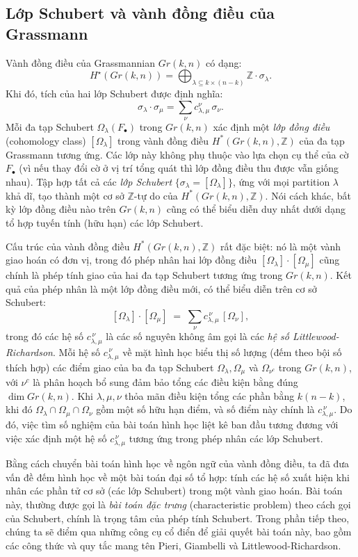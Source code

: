 \subsection{Lớp Schubert và vành đồng điều của Grassmann}
Vành đồng điều của Grassmannian $Gr(k,n)$ có dạng:
$$
H^\star(Gr(k,n)) = \bigoplus_{\lambda \subseteq k \times (n-k)} \mathbb{Z} \cdot \sigma_\lambda.
$$
Khi đó, tích của hai lớp Schubert được định nghĩa:
$$
\sigma_{\lambda} \cdot \sigma_{\mu} = \sum_{\nu} c_{\lambda, \mu}^{\nu} \, \sigma_{\nu}.
$$
Mỗi đa tạp Schubert $\Omega_\lambda(F_\bullet)$ trong $Gr(k,n)$ xác định một \textit{lớp đồng điều} (cohomology class) $[\Omega_\lambda]$ trong vành đồng điều $H^*(Gr(k,n), \mathbb{Z})$ của đa tạp Grassmann tương ứng. Các lớp này không phụ thuộc vào lựa chọn cụ thể của cờ $F_\bullet$ (vì nếu thay đổi cờ ở vị trí tổng quát thì lớp đồng điều thu được vẫn giống nhau). Tập hợp tất cả các \textit{lớp Schubert} $\{\sigma_\lambda = [\Omega_\lambda]\}$, ứng với mọi partition $\lambda$ khả dĩ, tạo thành một cơ sở $\mathbb{Z}$-tự do của $H^*(Gr(k,n),\mathbb{Z})$. Nói cách khác, bất kỳ lớp đồng điều nào trên $Gr(k,n)$ cũng có thể biểu diễn duy nhất dưới dạng tổ hợp tuyến tính (hữu hạn) các lớp Schubert.

Cấu trúc của vành đồng điều $H^*(Gr(k,n),\mathbb{Z})$ rất đặc biệt: nó là một vành giao hoán có đơn vị, trong đó phép nhân hai lớp đồng điều $[\Omega_{\lambda}] \cdot [\Omega_{\mu}]$ cũng chính là phép tính giao của hai đa tạp Schubert tương ứng trong $Gr(k,n)$. Kết quả của phép nhân là một lớp đồng điều mới, có thể biểu diễn trên cơ sở Schubert:
\[ [\Omega_{\lambda}] \cdot [\Omega_{\mu}] \;=\; \sum_{\nu} c_{\lambda,\mu}^{\,\nu}\, [\Omega_{\nu}], \]
trong đó các hệ số $c_{\lambda,\mu}^{\,\nu}$ là các số nguyên không âm gọi là các \textit{hệ số Littlewood-Richardson}. Mỗi hệ số $c_{\lambda,\mu}^{\,\nu}$ về mặt hình học biểu thị số lượng (đếm theo bội số thích hợp) các điểm giao của ba đa tạp Schubert $\Omega_{\lambda}, \Omega_{\mu}$ và $\Omega_{\nu^c}$ trong $Gr(k,n)$, với $\nu^c$ là phân hoạch bổ sung đảm bảo tổng các điều kiện bằng đúng $\dim Gr(k,n)$. Khi $\lambda, \mu, \nu$ thỏa mãn điều kiện tổng các phần bằng $k(n-k)$, khi đó $\Omega_{\lambda} \cap \Omega_{\mu} \cap \Omega_{\nu}$ gồm một số hữu hạn điểm, và số điểm này chính là $c_{\lambda,\mu}^{\,\nu}$. Do đó, việc tìm số nghiệm của bài toán hình học liệt kê ban đầu tương đương với việc xác định một hệ số $c_{\lambda,\mu}^{\,\nu}$ tương ứng trong phép nhân các lớp Schubert.

Bằng cách chuyển bài toán hình học về ngôn ngữ của vành đồng điều, ta đã đưa vấn đề đếm hình học về một bài toán đại số tổ hợp: tính các hệ số xuất hiện khi nhân các phần tử cơ sở (các lớp Schubert) trong một vành giao hoán. Bài toán này, thường được gọi là \textit{bài toán đặc trưng} (characteristic problem) theo cách gọi của Schubert, chính là trọng tâm của phép tính Schubert. Trong phần tiếp theo, chúng ta sẽ điểm qua những công cụ cổ điển để giải quyết bài toán này, bao gồm các công thức và quy tắc mang tên Pieri, Giambelli và Littlewood-Richardson.